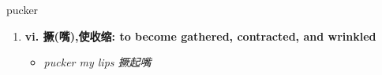 
\begin{frame}
{\huge pucker}
\begin{center}
\begin{enumerate}\Large
  \item \textbf{vi. 撅(嘴),使收缩: to become gathered, contracted, and wrinkled}
  \begin{itemize}
    \item \em{\Large{pucker my lips 撅起嘴}}
  \end{itemize}
\end{enumerate}
\end{center}
\end{frame}
